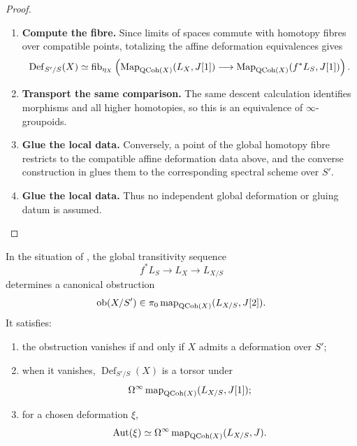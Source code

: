 \begin{proof}
\begin{enumerate}[label=\textup{(\arabic*)}]
    \item \textbf{Compute the fibre.}
    Since limits of spaces commute with homotopy fibres over compatible points, totalizing the
    affine deformation equivalences gives
    \[
    \operatorname{Def}_{S'/S}(X)
    \simeq
    \operatorname{fib}_{\eta_X}
    \left(
        \operatorname{Map}_{\operatorname{QCoh}(X)}(L_X,J[1])
        \longrightarrow
        \operatorname{Map}_{\operatorname{QCoh}(X)}(f^*L_S,J[1])
    \right).
    \]

    \item \textbf{Transport the same comparison.}
    The same descent calculation identifies morphisms and all higher homotopies, so this is an
    equivalence of \(\infty\)-groupoids.

    \item \textbf{Glue the local data.}
    Conversely, a point of the global homotopy fibre restricts to the compatible affine
    deformation data above, and the converse construction in
     glues them to the corresponding spectral scheme
    over \(S'\).

    \item \textbf{Glue the local data.}
    Thus no independent global deformation or gluing datum is assumed.
\end{enumerate}
\end{proof}

\begin{theorem}
\label{thm:global-cotangent-obstruction}
In the situation of
, the global transitivity sequence
\[
    f^*L_S
    \longrightarrow
    L_X
    \longrightarrow
    L_{X/S}
\]
determines a canonical obstruction
\[
    \operatorname{ob}(X/S')
    \in
    \pi_0\operatorname{map}_{\operatorname{QCoh}(X)}(L_{X/S},J[2]).
\]
It satisfies:
\begin{enumerate}[label=(\roman*)]
    \item the obstruction vanishes if and only if \(X\) admits a deformation
    over \(S'\);
    \item when it vanishes, \(\operatorname{Def}_{S'/S}(X)\) is a torsor
    under
    \[
        \Omega^\infty\operatorname{map}_{\operatorname{QCoh}(X)}(L_{X/S},J[1]);
    \]
    \item for a chosen deformation \(\xi\),
    \[
        \operatorname{Aut}(\xi)
        \simeq
        \Omega^\infty\operatorname{map}_{\operatorname{QCoh}(X)}(L_{X/S},J).
    \]
\end{enumerate}
\end{theorem}

